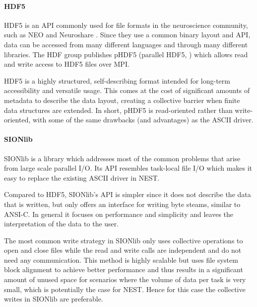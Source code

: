 \documentclass[]{YIC2015}
\begin{document}
\paragraph{HDF5}

HDF5 is an API commonly used for file formats in the neuroscience
community, such as NEO \cite{neo} and Neuroshare \cite{neuroshare}.
Since they use a common binary layout and API, data can be accessed
from many different languages and through many different libraries.
The HDF group publishes pHDF5 (parallel HDF5, \cite{hdf5}) which
allows read and write access to HDF5 files over MPI.

HDF5 is a highly structured, self-describing format intended for
long-term accessibility and versatile usage. This comes at the cost of
significant amounts of metadata to describe the data layout, creating
a collective barrier when finite data structures are extended. In
short, pHDF5 is read-oriented rather than write-oriented, with some of
the same drawbacks (and advantages) as the ASCII driver.


\paragraph{SIONlib}

SIONlib \cite{frings2009scalable} is a library which addresses most of
the common problems that arise from large scale parallel I/O. Its API
resembles task-local file I/O which makes it easy to replace the
existing ASCII driver in NEST.

Compared to HDF5, SIONlib's API is simpler since it does not describe
the data that is written, but only offers an interface for writing
byte steams, similar to ANSI-C. In general it focuses on performance
and simplicity and leaves the interpretation of the data to the user.

The most common write strategy in SIONlib only uses collective
operations to open and close files while the read and write calls are
independent and do not need any communication. This method is highly
scalable but uses file system block alignment to achieve better
performance and thus results in a significant amount of unused space
for scenarios where the volume of data per task is very small, which
is potentially the case for NEST. Hence for this case the collective
writes in SIONlib are preferable.
\end{document}
